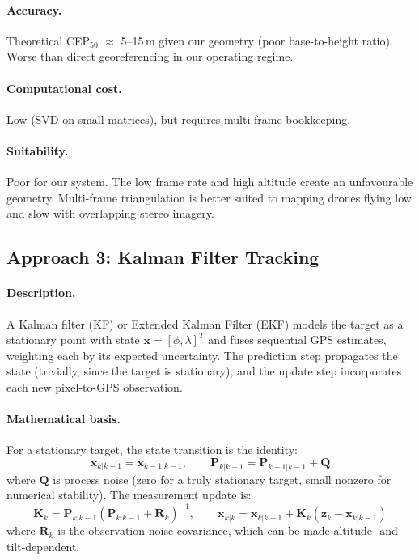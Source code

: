 \paragraph{Accuracy.}  Theoretical CEP$_{50}$ $\approx$ 5--15\,m given our geometry (poor base-to-height ratio).  Worse than direct georeferencing in our operating regime.

\paragraph{Computational cost.}  Low (SVD on small matrices), but requires multi-frame bookkeeping.

\paragraph{Suitability.}  Poor for our system.  The low frame rate and high altitude create an unfavourable geometry.  Multi-frame triangulation is better suited to mapping drones flying low and slow with overlapping stereo imagery.

\subsection{Approach 3: Kalman Filter Tracking}\label{sec:approach-kalman}

\paragraph{Description.}
A Kalman filter (KF) or Extended Kalman Filter (EKF) models the target as a stationary point with state $\mathbf{x} = [\phi, \lambda]^T$ and fuses sequential GPS estimates, weighting each by its expected uncertainty.  The prediction step propagates the state (trivially, since the target is stationary), and the update step incorporates each new pixel-to-GPS observation.

\paragraph{Mathematical basis.}
For a stationary target, the state transition is the identity:
\begin{equation}
  \mathbf{x}_{k|k-1} = \mathbf{x}_{k-1|k-1}, \qquad
  \mathbf{P}_{k|k-1} = \mathbf{P}_{k-1|k-1} + \mathbf{Q}
\end{equation}
where $\mathbf{Q}$ is process noise (zero for a truly stationary target, small nonzero for numerical stability).  The measurement update is:
\begin{equation}
  \mathbf{K}_k = \mathbf{P}_{k|k-1} (\mathbf{P}_{k|k-1} + \mathbf{R}_k)^{-1}, \qquad
  \mathbf{x}_{k|k} = \mathbf{x}_{k|k-1} + \mathbf{K}_k (\mathbf{z}_k - \mathbf{x}_{k|k-1})
\end{equation}
where $\mathbf{R}_k$ is the observation noise covariance, which can be made altitude- and tilt-dependent.

